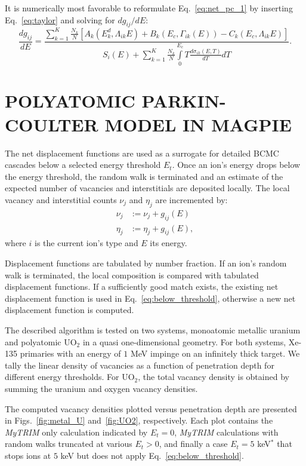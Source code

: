 \documentclass[letterpaper]{mandc2019}
\begin{document}
It is numerically most favorable to reformulate Eq.~\ref{eq:net_pc_1} by inserting Eq.~\ref{eq:taylor} and solving for $d g_{ij} / dE$:
\begin{equation}\label{eq:damage_energy_function_approx_1}
   \frac{d g_{ij}}{dE} = \frac{\sum\limits_{k=1}^K \frac{N_k}{N}   
  \left [ A_k(E_k^d, \Lambda_{ik} E) + B_k(E_c, \Gamma_{ik}(E)) - C_k(E_c, \Lambda_{ik} E)\right ]}
  {S_i(E) + \sum\limits_{k=1}^K \frac{N_k}{N}  \int\limits_0^{E_c} T \frac{d \sigma_{ik} (E,T)}{dT}   dT}.
\end{equation}

\section{POLYATOMIC PARKIN-COULTER MODEL IN MAGPIE} \label{sec:in_magpie}
The net displacement functions are used as a surrogate for detailed BCMC cascades below a selected energy threshold $E_t$.
Once an ion's energy drops below the energy threshold, the random walk is terminated and an estimate of the expected number of vacancies and interstitials are deposited locally. The local vacancy and interstitial counts $\nu_j$ and $\eta_j$ are incremented by:
\begin{align}\label{eq:below_threshold}
   \nu_j &:= \nu_j + g_{ij}(E) \nonumber \\
   \eta_j &:= \eta_j + g_{ij}(E),
\end{align}
where $i$ is the current ion's type and $E$ its energy.

Displacement functions are tabulated by number fraction. If an ion's random walk is terminated, the local composition is compared with tabulated displacement functions. If a sufficiently good match exists, the existing net displacement function is used in Eq.~\ref{eq:below_threshold}, otherwise a new net displacement function is computed.

The described algorithm is tested on two systems, monoatomic metallic uranium and polyatomic UO$_2$ in a quasi one-dimensional geometry. For both systems, Xe-135 primaries with an energy of $1$ MeV impinge on an infinitely thick target. We tally the linear density of vacancies as a function of penetration depth for different energy thresholds. For UO$_2$, the total vacancy density is obtained by summing the uranium and oxygen vacancy densities. 

The computed vacancy densities plotted versus penetration depth are presented in Figs.~\ref{fig:metal_U} and~\ref{fig:UO2}, respectively. Each plot
contains the \textit{MyTRIM} only calculation indicated by $E_t=0$, \textit{MyTRIM} calculations with random walks truncated at various $E_t > 0$, and finally a case $E_t = 5$ keV$^*$ that stops ions at $5$ keV but does not apply Eq.~\ref{eq:below_threshold}.
\end{document}
